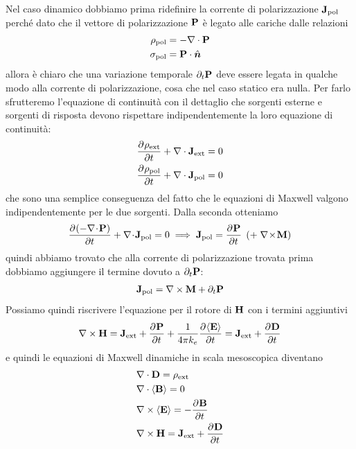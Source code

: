 Nel caso dinamico dobbiamo prima ridefinire la corrente di polarizzazione $ \mathbf{J}_{\text{pol}} $ perché dato che il vettore di polarizzazione $ \mathbf{P} $ è 
legato alle cariche dalle relazioni 
\begin{align}
  \rho_{\text{pol}} &= - \nabla \cdot \mathbf{P}
  \\
  \sigma_{\text{pol}} &= \mathbf{P} \cdot \hat{\boldsymbol{n}}
\end{align}
allora è chiaro che una variazione temporale $ \partial_t \mathbf{P} $ deve essere legata in qualche modo alla corrente di polarizzazione, cosa che nel caso 
statico era nulla. Per farlo sfrutteremo l'equazione di continuità con il dettaglio che sorgenti esterne e sorgenti di risposta devono rispettare 
indipendentemente la loro equazione di continuità:
\begin{align}
  \frac{\partial^{} {\rho_{\text{ext}}}}{\partial {t}^{}} + \nabla \cdot \mathbf{J}_{\text{ext}} &= 0
  \\
  \frac{\partial^{} {\rho_{\text{pol}}}}{\partial {t}^{}} + \nabla \cdot \mathbf{J}_{\text{pol}} &= 0
\end{align}
che sono una semplice conseguenza del fatto che le equazioni di Maxwell valgono indipendentemente per le due sorgenti. Dalla seconda otteniamo
\begin{align}
  \frac{\partial^{} {(-\nabla\!\cdot\!\mathbf{ P })}}{\partial {t}^{}} + \nabla\!\cdot\!\mathbf{ J }_{\text{pol}} = 0 
  \implies \mathbf{J}_{\text{pol}} = \frac{\partial^{} {\mathbf{P}}}{\partial {t}^{}} \;\left( + \;\nabla\!\times\!\mathbf{ M } \right)
\end{align}
quindi abbiamo trovato che alla corrente di polarizzazione trovata prima dobbiamo aggiungere il termine dovuto a $ \partial_t\mathbf{P} $:
\begin{align}
  \mathbf{J}_{\text{pol}} = \nabla \times \mathbf{M} + \partial_t \mathbf{P}
\end{align}
Possiamo quindi riscrivere l'equazione per il rotore di $ \mathbf{H} $ con i termini aggiuntivi
\begin{align}
  \nabla \times \mathbf{H} = \mathbf{J}_{\text{ext}} + \frac{\partial^{} {\mathbf{P}}}{\partial {t}^{}} + \frac{1}{4\pi k_e} \frac{\partial^{} {\langle \mathbf{E} \rangle}}{\partial {t}^{}} = \mathbf{J}_{\text{ext}} + \frac{\partial^{} {\mathbf{D}}}{\partial {t}^{}}
\end{align}
e quindi le equazioni di Maxwell dinamiche in scala mesoscopica diventano
\begin{align}
  &\nabla \cdot \mathbf{D} = \rho_{\text{ext}}
  \\
  &\nabla \cdot \langle \mathbf{B} \rangle = 0
  \\
  &\nabla \times \langle \mathbf{E} \rangle = - \frac{\partial^{} {\mathbf{B}}}{\partial {t}^{}}
  \\
  &\nabla \times \mathbf{H} = \mathbf{J}_{\text{ext}} + \frac{\partial^{} {\mathbf{D}}}{\partial {t}^{}}
\end{align}
